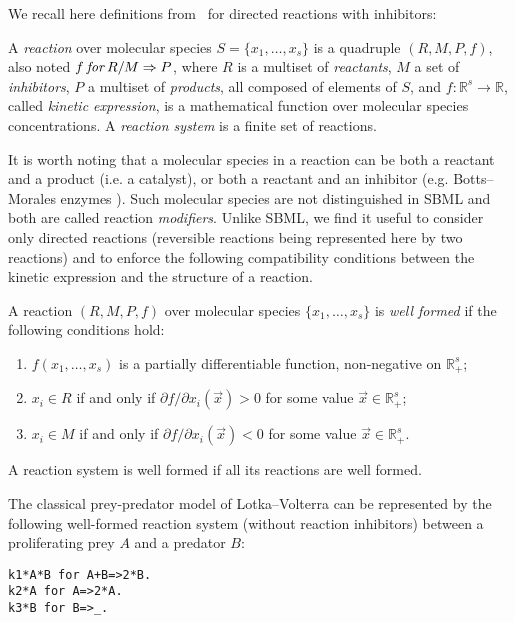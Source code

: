 \documentclass{llncs}
\newcommand\for{\mathbin{\text{\it for}}}
\begin{document}
We recall here definitions from~\cite{FGS15tcs,FS08fmsb} for directed reactions with inhibitors:

\begin{definition}
A \emph{reaction} over molecular species $S = \{x_1,\dots,x_s\}$
is a quadruple $(R,M,P,f)$, also noted $f \for R / M \Rightarrow P$,
where $R$ is a multiset of \emph{reactants}, $M$ a set of \emph{inhibitors},
$P$ a multiset of \emph{products}, all composed of elements of $S$,
and $f:\mathbb{R}^s\rightarrow\mathbb{R}$, called \emph{kinetic expression},
is a mathematical function over molecular species concentrations.
A \emph{reaction system} is a finite set of reactions.
\end{definition}

It is worth noting that a molecular species in a reaction can be both a reactant and a product (i.e. a catalyst),
or both a reactant and an inhibitor (e.g. Botts--Morales enzymes \cite{Katsumata72jtb}).
Such molecular species are not distinguished in SBML and both are called reaction \emph{modifiers}.
Unlike SBML, we find it useful to consider only directed reactions (reversible reactions being represented here by two reactions)
and to enforce the following compatibility conditions between the kinetic expression and the structure of a reaction.

\begin{definition}\label{defi:rwell}
A reaction $(R,M,P,f)$ 
over molecular species $\{x_1,\dots,x_s\}$
is \emph{well formed} if the following conditions hold:
\begin{enumerate}
\item $f(x_1,\dots,x_s)$ is a partially differentiable function, non-negative
   on $\mathbb{R}_+^s$;
\item $x_i\in R$ if and only if ${\partial {f}}/ {\partial x_i}(\vec x)>0$ for some value $\vec x\in\mathbb{R}_+^s$;
\item $x_i\in M$ if and only if ${\partial {f}}/ {\partial x_i}(\vec x)<0$ for some value $\vec x\in\mathbb{R}_+^s$.
\end{enumerate}
A reaction system is well formed
if all its reactions are well formed.
\end{definition}


\begin{example}\label{LV}
  The classical prey-predator model of Lotka--Volterra can be represented by the following well-formed reaction system
  (without reaction inhibitors) between a proliferating prey $A$ and a predator $B$:
   \begin{lstlisting}
k1*A*B for A+B=>2*B.
k2*A for A=>2*A.
k3*B for B=>_.
   \end{lstlisting}
\end{example}
\end{document}
